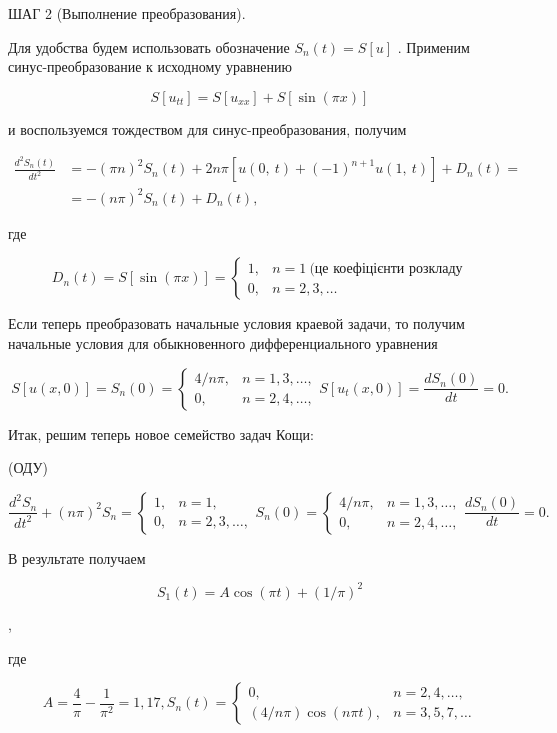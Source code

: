 \documentclass[
  ukrainian,
]{article}
\begin{document}
ШАГ 2 (Выполнение преобразования).

Для удобства будем использовать обозначение \(S_n(t) = S[u]\) . Применим
синус-преобразование к исходному уравнению

\[
S[u_{tt}] = S[u_{xx}] + S[\sin(\pi x)]
\]

и воспользуемся тождеством для синус-преобразования, получим

\[
\begin{split} \frac{d^2S_n\left(t\right)}{dt^2} &= -\left(\pi n\right)^2S_n\left(t\right) + 2n\pi\left[u\left(0,\ t\right) + \left(-1\right)^{n+1}u\left(1,\ t\right)\right] + D_n\left(t\right) = \\ &= -\left(n\pi\right)^2S_n\left(t\right) + D_n\left(t\right),  \end{split}
\]

где

\[
D_n(t) = S[\sin(\pi x)] = \begin{cases} 1, & n = 1 \ \text{(це коефіцієнти розкладу} \\0, &n = 2, 3, \dots \end{cases}
\]

Если теперь преобразовать начальные условия краевой задачи, то получим
начальные условия для обыкновенного дифференциального уравнения

\[
S[u(x, 0)] = S_n(0) = \begin{cases} 4/n\pi, & n = 1, 3, \dots, \\ 0, &n = 2, 4, \dots, \end{cases}
S[u_t(x, 0)] = \frac{dS_n(0)}{dt} = 0.
\]

Итак, решим теперь новое семейство задач Кощи:

(ОДУ)

\[
\frac{d^2S_n}{dt^2} + (n\pi)^2 S_n = \begin{cases} 1, &n = 1, \\ 0, &n = 2, 3, \dots, \end{cases}
S_n(0) = \begin{cases}
4/n\pi, & n = 1, 3, \dots, \\
0, & n = 2, 4, \dots,
\end{cases}
\frac{dS_n(0)}{dt} = 0.
\]

В результате получаем

\[
S_1(t) = A\cos(\pi t) + (1/\pi)^2
\]

,

где

\[
A = \frac{4}{\pi} - \frac{1}{\pi^2} = 1,17,
S_n(t) = \begin{cases} 0, &n = 2, 4, \dots, \\ (4/n\pi)\cos(n\pi t), &n = 3, 5, 7, \dots \end{cases}
\]
\end{document}
